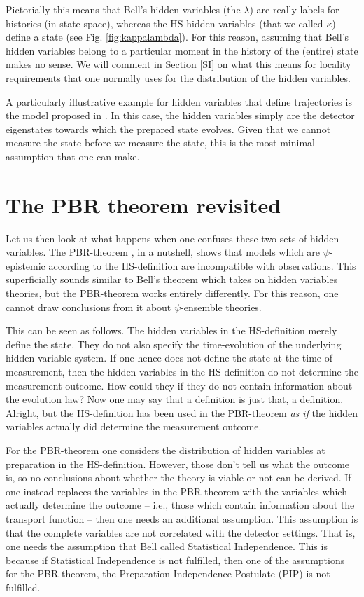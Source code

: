\documentclass[superscriptaddress,floatfix,nofootinbib,12pt]{revtex4-2}
\begin{document}
Pictorially this means that Bell's hidden variables (the $\lambda$) are really labels for histories (in state space), whereas the HS hidden variables (that we called $\kappa$) define a state (see Fig. \ref{fig:kappalambda}). For this reason, assuming that Bell's hidden variables belong to a particular moment in the history of the (entire) state makes no sense. We will comment in Section \ref{SI} on what this means for locality requirements that one normally uses for the distribution of the hidden variables. 

A particularly illustrative example for hidden variables that define trajectories is the model proposed in \cite{Palmer2009ISP,Palmer2020Discretization}. In this case, the hidden variables simply are the detector eigenstates towards which the prepared state evolves. Given that we cannot measure the state before we measure the state, this is the most minimal assumption that one can make. 

\section{The PBR theorem revisited}
\label{PBRsection}

Let us then look at what happens when one confuses these two sets of hidden variables.
The {\sc PBR}-theorem \cite{Pusey2012Reality}, in a nutshell, shows that models which are $\psi$-epistemic according to the HS-definition are incompatible with observations. This superficially sounds similar to Bell's theorem which takes on hidden variables theories, but the {\sc PBR}-theorem works entirely differently. For this reason, one cannot draw conclusions from it about $\psi$-ensemble theories. 

This can be seen as follows. The hidden variables in the HS-definition merely define the state. They do not also specify the time-evolution of the underlying hidden variable system. If one hence does not define the state at the time of measurement, then the hidden variables in the HS-definition do not determine the measurement outcome. How could they if they do not contain information about the evolution law? 
Now one may say that a definition is just that, a definition. Alright, but the HS-definition has been used in the {\sc PBR}-theorem \emph{as if} the hidden variables actually did determine the measurement outcome. 

For the {\sc PBR}-theorem one considers the distribution of hidden variables at preparation in the HS-definition. However, those don't tell us what the outcome is, so no conclusions about whether the theory is viable or not can be derived. If one instead replaces the variables in the {\sc PBR}-theorem with the variables which actually determine the outcome -- i.e., those which contain information about the transport function -- then one needs an additional assumption. This assumption is that the complete variables are not correlated with the detector settings. That is, one needs the assumption that Bell called Statistical Independence. This is because if Statistical Independence is not fulfilled, then one of the assumptions for the {\sc PBR}-theorem, the Preparation Independence Postulate ({\sc PIP}) is not fulfilled.
\end{document}
